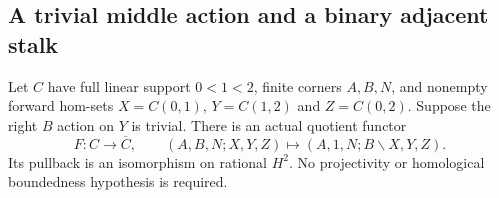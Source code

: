 \subsection{A trivial middle action and a binary adjacent stalk}

\begin{lemma}
\label{CP2:A-linear-trivial-middle-action-H2}
Let $C$ have full linear support $0<1<2$, finite corners
$A,B,N$, and nonempty forward hom-sets $X=C(0,1)$,
$Y=C(1,2)$ and $Z=C(0,2)$.  Suppose the right $B$ action
on $Y$ is trivial.  There is an actual quotient functor
\[
 F:C\longrightarrow \overline C,
 \qquad
 (A,B,N;X,Y,Z)\longmapsto(A,1,N;B\backslash X,Y,Z).
\]
Its pullback is an isomorphism on rational $H^2$.
No projectivity or homological boundedness hypothesis is required.
\end{lemma}
